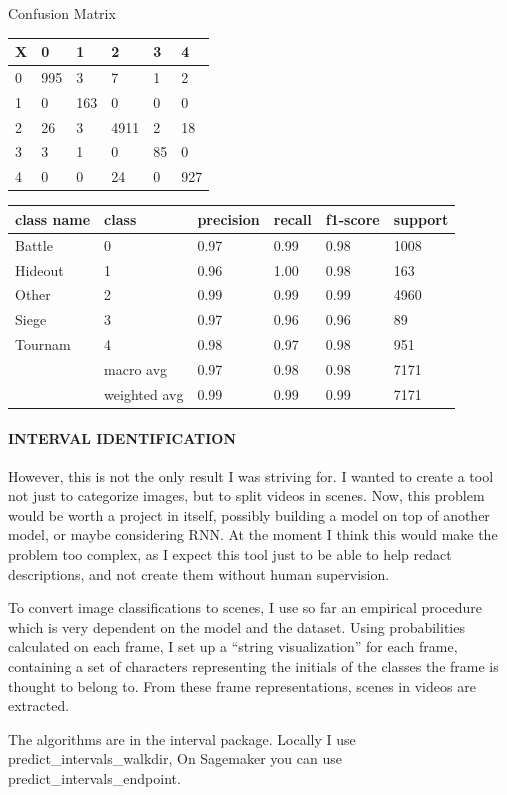 \documentclass[
]{article}
\begin{document}
Confusion Matrix

\begin{longtable}[]{@{}llllll@{}}
\toprule
X & 0 & 1 & 2 & 3 & 4\tabularnewline
\midrule
\endhead
0 & 995 & 3 & 7 & 1 & 2\tabularnewline
1 & 0 & 163 & 0 & 0 & 0\tabularnewline
2 & 26 & 3 & 4911 & 2 & 18\tabularnewline
3 & 3 & 1 & 0 & 85 & 0\tabularnewline
4 & 0 & 0 & 24 & 0 & 927\tabularnewline
\bottomrule
\end{longtable}

\begin{longtable}[]{@{}llllll@{}}
\toprule
class name & class & precision & recall & f1-score &
support\tabularnewline
\midrule
\endhead
Battle & 0 & 0.97 & 0.99 & 0.98 & 1008\tabularnewline
Hideout & 1 & 0.96 & 1.00 & 0.98 & 163\tabularnewline
Other & 2 & 0.99 & 0.99 & 0.99 & 4960\tabularnewline
Siege & 3 & 0.97 & 0.96 & 0.96 & 89\tabularnewline
Tournam & 4 & 0.98 & 0.97 & 0.98 & 951\tabularnewline
& macro avg & 0.97 & 0.98 & 0.98 & 7171\tabularnewline
& weighted avg & 0.99 & 0.99 & 0.99 & 7171\tabularnewline
\bottomrule
\end{longtable}

\hypertarget{interval-identification}{%
\paragraph{INTERVAL IDENTIFICATION}\label{interval-identification}}

However, this is not the only result I was striving for. I wanted to
create a tool not just to categorize images, but to split videos in
scenes. Now, this problem would be worth a project in itself, possibly
building a model on top of another model, or maybe considering RNN. At
the moment I think this would make the problem too complex, as I expect
this tool just to be able to help redact descriptions, and not create
them without human supervision.

To convert image classifications to scenes, I use so far an empirical
procedure which is very dependent on the model and the dataset. Using
probabilities calculated on each frame, I set up a ``string
visualization'' for each frame, containing a set of characters 
representing the initials of the classes the frame is thought to 
belong to. From these frame representations, scenes in videos are
 extracted.
 

The algorithms are in the interval package.
Locally I use predict\_intervals\_walkdir,
On Sagemaker you can use predict\_intervals\_endpoint.
\end{document}
